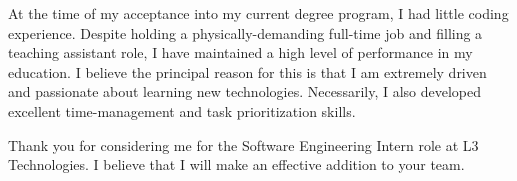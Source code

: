 \documentclass[11pt,a4paper,roman]{moderncv}        %
\begin{document}
At the time of my acceptance into my current degree program, I had little coding experience. Despite holding a physically-demanding full-time job and filling a teaching assistant role, I have maintained a high level of performance in my education. I believe the principal reason for this is that I am extremely driven and passionate about learning new technologies. Necessarily, I also developed excellent time-management and task prioritization skills.

Thank you for considering me for the Software Engineering Intern role at L3 Technologies. I believe that I will make an effective addition to your team.



\makeletterclosing
\end{document}
